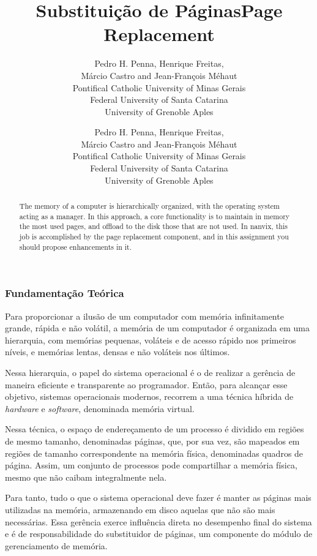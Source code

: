 \documentclass[11pt]{article}
\title{Substituição de Páginas}
\author{
	Pedro H. Penna, Henrique Freitas,\\%
	Márcio Castro and Jean-François Méhaut\\[0.3em]
	\small Pontifical Catholic University of Minas Gerais\\
	\small Federal University of Santa Catarina\\
	\small University of Grenoble Aples}
\date{}
\title{Page Replacement}
\author{
	Pedro H. Penna, Henrique Freitas,\\%
	Márcio Castro and Jean-François Méhaut\\[0.3em]
	\small Pontifical Catholic University of Minas Gerais\\
	\small Federal University of Santa Catarina\\
	\small University of Grenoble Aples}
\date{}
\newif\ifbr
\newif\ifen
\begin{document}
\maketitle

\begin{abstract}
\ifbr
	\noindent A memória de um computador é organizada em uma hierarquia,
	com o sistema operacional atuando como gerente. Nessa organização,
	uma função fundamental é a de manter páginas utilizadas em memória e
	descarregar as não necessárias em disco. No Nanvix, essa tarefa é de
	responsabilidade do substituidor de páginas e nesse projeto você
	deverá propor melhorias a ele.
\else\ifen
	\noindent The memory of a computer is hierarchically organized, with
	the operating system acting as a manager. In this approach, a core
	functionality is to maintain in memory the most used pages, and
	offload to the disk those that are not used. In nanvix, this job is
	accomplished by the page replacement component, and in this
	assignment you should propose enhancements in it.
\fi\fi
\end{abstract}

\ifbr
	\subsubsection*{Fundamentação Teórica}

		Para proporcionar a ilusão de um computador com memória
		infinitamente grande, rápida e não volátil, a memória de um
		computador é organizada em uma hierarquia, com memórias
		pequenas, voláteis e de acesso rápido nos primeiros níveis, e
		memórias lentas, densas e não voláteis nos últimos.

		Nessa hierarquia, o papel do sistema operacional é o de realizar
		a gerência de maneira eficiente e transparente ao programador.
		Então, para alcançar esse objetivo, sistemas operacionais
		modernos, recorrem a uma técnica híbrida de \textit{hardware} e
		\textit{software}, denominada memória virtual.

		Nessa técnica, o espaço de endereçamento de um processo é
		dividido em regiões de mesmo tamanho, denominadas páginas, que,
		por sua vez, são mapeados em regiões de tamanho correspondente
		na memória física, denominadas quadros de página. Assim, um
		conjunto de processos pode compartilhar a memória física, mesmo
		que não caibam integralmente nela.

		Para tanto, tudo o que o sistema operacional deve fazer é manter
		as páginas mais utilizadas na memória, armazenando em disco
		aquelas que não são mais necessárias. Essa gerência exerce
		influência direta no desempenho final do sistema e é de
		responsabilidade do substituidor de páginas, um componente do
		módulo de gerenciamento de memória.
\else\ifen
\end{document}
